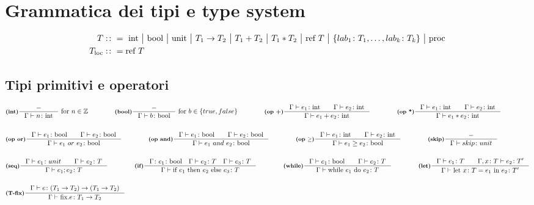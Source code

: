 \documentclass[a4paper, 10pt]{article}
\newcommand{\numberset}{\mathbb}
\newcommand{\Z}{\numberset{Z}}
\newcommand{\integer}{\textup{int}}
\newcommand{\bool}{\textup{bool}}
\newcommand{\infer}[4]{\inference[\textbf{#1}]{#2}{#3}#4 }
\begin{document}
\section*{Grammatica dei tipi e type system}
\vspace{-.5cm}
\begin{minipage}{.45\linewidth}
	\begin{flushleft}
	\begin{align*}
		T&:\colon=\ \integer\ \big|\ \bool\ \big|\ \textup{unit}\ \big|\ T_1\rightarrow T_2\ \big|\ T_1 + T_2\ \big|\ T_1 * T_2\ 
		\big|\ \textup{ref}\ T\ \big|\ \{lab_1\colon T_1, \dots, lab_k\colon T_k \}\ \big|\ \text{proc} \\
		T_{\text{loc}}&:\colon = \text{ref } T
	\end{align*}	
	\vspace{-1cm}
\subsection*{Tipi primitivi e operatori}
	\begin{align*}
		&\infer{(int)}{-}{\Gamma \vdash n\colon \integer}{\ \textup{for}\ n \in \Z} \qquad\qquad
		\infer{(bool)}{-}{\Gamma \vdash b\colon \bool}{\ \textup{for}\ b \in \{true, false\}} \qquad\qquad
		\infer{(op +)}{\Gamma \vdash e_1\colon \integer\qquad \Gamma \vdash e_2\colon \integer}{\Gamma\vdash e_1 + e_2 \colon \integer}{}\qquad\qquad
		\infer{(op *)}{\Gamma \vdash e_1\colon \integer\qquad \Gamma \vdash e_2\colon \integer}{\Gamma\vdash e_1 * e_2 \colon \integer}{} \\ \\
		&\infer{(op or)}{\Gamma\vdash e_1\colon \bool\qquad \Gamma\vdash e_2\colon\bool}{\Gamma\vdash e_1\ or\ e_2 \colon\bool}{}\qquad\qquad
		\infer{(op and)}{\Gamma\vdash e_1\colon \bool\qquad \Gamma\vdash e_2\colon\bool}{\Gamma\vdash e_1\ and\ e_2 \colon\bool}{} \qquad\qquad
		\infer{(op $ \geq $)}{\Gamma \vdash e_1\colon \integer\qquad \Gamma \vdash e_2\colon \integer}{\Gamma\vdash e_1 \geq e_2 \colon \bool}{}\qquad\qquad
		\infer{(skip)}{-}{\Gamma\vdash skip\colon unit}{}\\ \\
		&\infer{(seq)}{\Gamma \vdash e_1\colon unit \qquad \Gamma\vdash e_2\colon T}{\Gamma \vdash e_1;e_2\colon T}{}\qquad\qquad
		\infer{(if)}{\Gamma\colon e_1\colon\bool\quad\Gamma\vdash e_2\colon T\quad \Gamma\vdash e_3 \colon T}{\Gamma\vdash \textup{if}\ e_1\ \textup{then}\ e_2\ \textup{else}\ e_3\colon T }{} \qquad\qquad
		\infer{(while)}{\Gamma\vdash e_1 \colon \bool\qquad \Gamma\vdash e_2 \colon T}{\Gamma \vdash\textup{while}\ e_1\ \textup{do}\ e_2\colon T}{}\qquad\qquad
		\infer{(let)}{\Gamma \vdash e_1\colon T\qquad \Gamma,x\colon T \vdash e_2\colon T'}{
			\Gamma\vdash \textup{let}\ x\colon T = e_1\ \textup{in}\ e_2\colon T'}{} \\ \\
		&\infer{(T-fix)}{\Gamma\vdash e\colon (T_1\rightarrow T_2)\rightarrow(T_1\rightarrow T_2)}{\Gamma\vdash \text{fix}.e\colon T_1\rightarrow T_2}{}
	\end{align*}

\end{flushleft}
\end{minipage}
\end{document}
